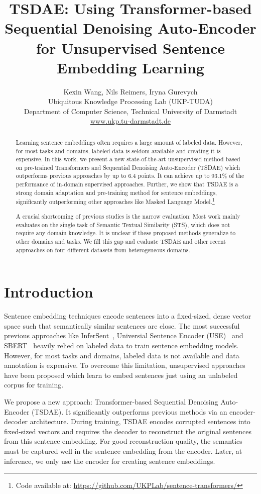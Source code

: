 \documentclass[11pt]{article}
\title{TSDAE: Using Transformer-based Sequential Denoising Auto-Encoder for Unsupervised Sentence Embedding Learning}
\author{Kexin Wang, Nils Reimers, Iryna Gurevych \\
	Ubiquitous Knowledge Processing Lab (UKP-TUDA)\\
	Department of Computer Science, Technical University of Darmstadt\\
	\url{www.ukp.tu-darmstadt.de}}
\begin{document}
\maketitle
\begin{abstract}
Learning sentence embeddings often requires a large amount of labeled data. However, for most tasks and domains, labeled data is seldom available and creating it is expensive. In this work, we present a new state-of-the-art unsupervised method based on pre-trained Transformers and Sequential Denoising Auto-Encoder (TSDAE) which outperforms previous approaches by up to 6.4 points. It can achieve up to 93.1\% of the performance of in-domain supervised approaches. Further, we show that TSDAE is a strong domain adaptation and pre-training method for  sentence embeddings, significantly outperforming other approaches like Masked Language Model.\footnote{Code available at: \url{https://github.com/UKPLab/sentence-transformers/}}


A crucial shortcoming of previous studies is the narrow evaluation: Most work mainly evaluates on the single task of Semantic Textual Similarity (STS), which does not require any domain knowledge. It is unclear if these proposed methods generalize to other domains and tasks. We fill this gap and evaluate TSDAE and other recent approaches on four different datasets from heterogeneous domains.
\end{abstract}

\section{Introduction}
Sentence embedding techniques encode sentences into a fixed-sized, dense vector space such that semantically similar sentences are close. The most successful previous approaches like InferSent~\citep{conneau-EtAl:2017:EMNLP2017}, Universial Sentence Encoder (USE)~\citep{DBLP:conf/emnlp/CerYKHLJCGYTSK18} and SBERT~\citep{DBLP:conf/emnlp/ReimersG19} heavily relied on labeled data to train sentence embedding models. However, for most tasks and domains, labeled data is not available and data annotation is expensive. To overcome this limitation, unsupervised approaches have been proposed which learn to embed sentences just using an unlabeled corpus for training.

We propose a new approach: Transformer-based Sequential Denoising Auto-Encoder (TSDAE). It significantly outperforms previous methods via an encoder-decoder architecture. During training, TSDAE encodes corrupted sentences into fixed-sized vectors and requires the decoder to reconstruct the original sentences from this sentence embedding. For good reconstruction quality, the semantics must be captured well in the sentence embedding from the encoder. Later, at inference, we only use the encoder for creating sentence embeddings.
\end{document}
